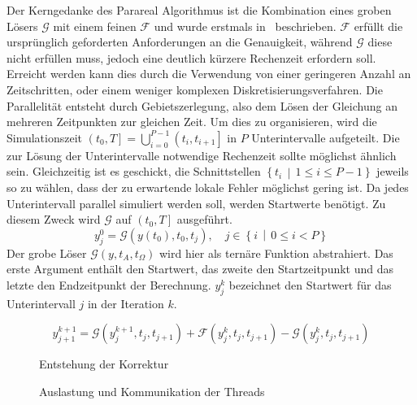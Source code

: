 Der Kerngedanke des Parareal Algorithmus ist die Kombination eines groben Lösers \(\mathcal{G}\) mit einem feinen \(\mathcal{F}\) und wurde erstmals in~\cite{Lions:2001} beschrieben. \(\mathcal{F}\) erfüllt die ursprünglich geforderten Anforderungen an die Genauigkeit, während \(\mathcal{G}\) diese nicht erfüllen muss, jedoch eine deutlich kürzere Rechenzeit erfordern soll. Erreicht werden kann dies durch die Verwendung von einer geringeren Anzahl an Zeitschritten, oder einem weniger komplexen Diskretisierungsverfahren. Die Parallelität entsteht durch Gebietszerlegung, also dem Lösen der Gleichung an mehreren Zeitpunkten zur gleichen Zeit. Um dies zu organisieren, wird die Simulationszeit \(\left(t_0, T\right] = \bigcup_{i=0}^{P-1} \left(t_i, t_{i+1}\right]\) in \(P\) Unterintervalle aufgeteilt. Die zur Lösung der Unterintervalle notwendige Rechenzeit sollte möglichst ähnlich sein. Gleichzeitig ist es geschickt, die Schnittstellen \(\left\{t_i \,\middle|\, 1 \leq i \leq P-1\right\}\) jeweils so zu wählen, dass der zu erwartende lokale Fehler möglichst gering ist. Da jedes Unterintervall parallel simuliert werden soll, werden Startwerte benötigt. Zu diesem Zweck wird \(\mathcal{G}\) auf \(\left(t_0, T\right]\) ausgeführt.
\begin{displaymath}
    y_{j}^{0} = \mathcal{G}\!\left(y(t_0), t_0, t_{j}\right), \quad j \in \left\{i \,\middle|\, 0 \leq i < P\right\}
\end{displaymath}
Der grobe Löser \(\mathcal{G}\!\left(y, t_{A}, t_{\Omega}\right)\) wird hier als ternäre Funktion abstrahiert. Das erste Argument enthält den Startwert, das zweite den Startzeitpunkt und das letzte den Endzeitpunkt der Berechnung. \(y_j^k\) bezeichnet den Startwert für das Unterintervall \(j\) in der Iteration \(k\).

\begin{displaymath}
    y_{j+1}^{k+1} = \mathcal{G}\!\!\left(y_j^{k+1}, t_j, t_{j+1}\right) + \mathcal{F}\!\!\left(y_j^k, t_j, t_{j+1}\right) - \mathcal{G}\!\!\left(y_j^k, t_j, t_{j+1}\right)
\end{displaymath}

\begin{figure}[ht]
\centering
    \begin{tikzpicture}[scale=2.2]
        
    \end{tikzpicture}
\caption{Entstehung der Korrektur}
\end{figure}

\begin{figure}[ht]
\centering
    
\caption{Auslastung und Kommunikation der Threads}
\end{figure}